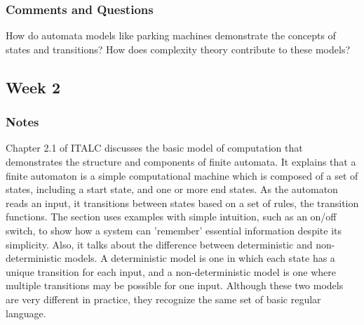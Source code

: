 \documentclass{article}
\theoremstyle{theorem}
\theoremstyle{definition}
\theoremstyle{remark}
\begin{document}








\subsubsection*{Comments and Questions}

How do automata models like parking machines demonstrate the concepts of states and transitions? How does complexity theory contribute to these models?

\subsection{Week 2}

\subsubsection*{Notes}

Chapter 2.1 of ITALC discusses the basic model of computation that demonstrates the structure and components of finite automata. It explains that a finite automaton is a simple computational machine which is composed of a set of states, including a start state, and one or more end states. As the automaton reads an input, it transitions between states based on a set of rules, the transition functions. The section uses examples with simple intuition, such as an on/off switch, to show how a system can 'remember' essential information despite its simplicity. Also, it talks about the difference between deterministic and non-deterministic models. A deterministic model is one in which each state has a unique transition for each input, and a non-deterministic model is one where multiple transitions may be possible for one input. Although these two models are very different in practice, they recognize the same set of basic regular language. 
\end{document}

